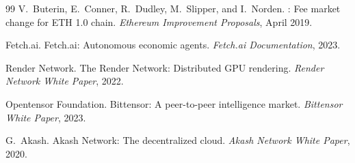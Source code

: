 \begin{thebibliography}{99}
V.~Buterin, E.~Conner, R.~Dudley, M.~Slipper, and I.~Norden.
: Fee market change for {ETH 1.0} chain.
\newblock \emph{Ethereum Improvement Proposals}, April 2019.

{Fetch.ai}.
\newblock Fetch.ai: Autonomous economic agents.
\newblock \emph{Fetch.ai Documentation}, 2023.

{Render Network}.
\newblock The Render Network: Distributed {GPU} rendering.
\newblock \emph{Render Network White Paper}, 2022.

{Opentensor Foundation}.
\newblock Bittensor: A peer-to-peer intelligence market.
\newblock \emph{Bittensor White Paper}, 2023.

G.~Akash.
\newblock Akash Network: The decentralized cloud.
\newblock \emph{Akash Network White Paper}, 2020.

\end{thebibliography}

